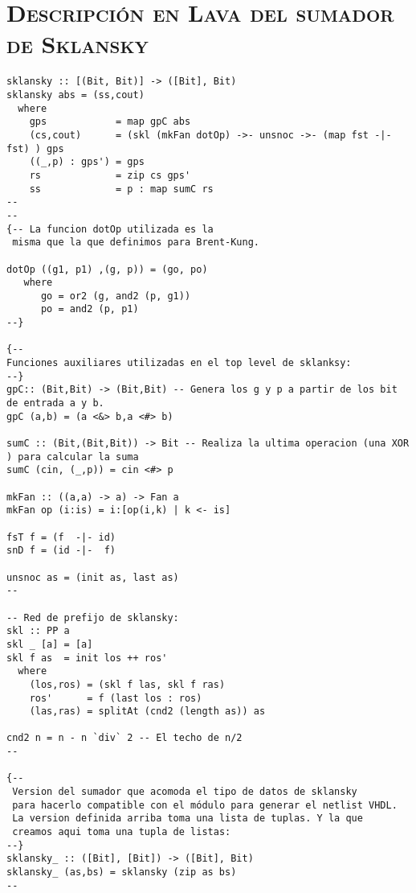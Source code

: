 \chapter{\textsc{ Descripción en Lava del sumador de Sklansky }}\label{chap:sklansky-lava}
\lstset{language=Haskell} 
\begin{lstlisting}
sklansky :: [(Bit, Bit)] -> ([Bit], Bit)
sklansky abs = (ss,cout)
  where
    gps            = map gpC abs
    (cs,cout)      = (skl (mkFan dotOp) ->- unsnoc ->- (map fst -|- fst) ) gps
    ((_,p) : gps') = gps
    rs             = zip cs gps'
    ss             = p : map sumC rs
--
-- 
{-- La funcion dotOp utilizada es la
 misma que la que definimos para Brent-Kung.

dotOp ((g1, p1) ,(g, p)) = (go, po)
   where
      go = or2 (g, and2 (p, g1))
      po = and2 (p, p1)
--}

{--
Funciones auxiliares utilizadas en el top level de sklanksy:
--}
gpC:: (Bit,Bit) -> (Bit,Bit) -- Genera los g y p a partir de los bit de entrada a y b.
gpC (a,b) = (a <&> b,a <#> b)

sumC :: (Bit,(Bit,Bit)) -> Bit -- Realiza la ultima operacion (una XOR ) para calcular la suma
sumC (cin, (_,p)) = cin <#> p

mkFan :: ((a,a) -> a) -> Fan a
mkFan op (i:is) = i:[op(i,k) | k <- is]

fsT f = (f  -|- id)
snD f = (id -|-  f)

unsnoc as = (init as, last as)
--

-- Red de prefijo de sklansky:
skl :: PP a
skl _ [a] = [a]
skl f as  = init los ++ ros'
  where
    (los,ros) = (skl f las, skl f ras)
    ros'      = f (last los : ros)
    (las,ras) = splitAt (cnd2 (length as)) as

cnd2 n = n - n `div` 2 -- El techo de n/2
--

{--
 Version del sumador que acomoda el tipo de datos de sklansky
 para hacerlo compatible con el módulo para generar el netlist VHDL.
 La version definida arriba toma una lista de tuplas. Y la que 
 creamos aqui toma una tupla de listas:
--}
sklansky_ :: ([Bit], [Bit]) -> ([Bit], Bit) 
sklansky_ (as,bs) = sklansky (zip as bs)
--

\end{lstlisting}
